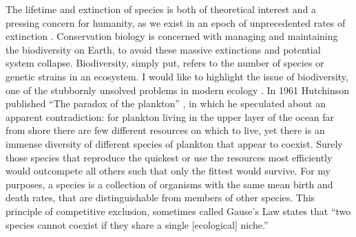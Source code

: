 The lifetime and extinction of species is both of theoretical interest and a pressing concern for humanity, as we exist in an epoch of unprecedented rates of extinction \cite{Saavedra2013}. 
Conservation biology is concerned with managing and maintaining the biodiversity on Earth, to avoid these massive extinctions and potential system collapse. 
Biodiversity, simply put, refers to the number of species or genetic strains in an ecosystem. 
%
I would like to highlight the issue of biodiversity, one of the stubbornly unsolved problems in modern ecology \cite{May1999,Chesson2000,Pennisi2005,Kelly2008}. %
In 1961 Hutchinson published ``The paradox of the plankton'' \cite{Hutchinson1961}, in which he speculated about an apparent contradiction: for plankton living in the upper layer of the ocean far from shore there are few different resources on which to live, yet there is an immense diversity of different species of plankton that appear to coexist. 
Surely those species that reproduce the quickest or use the resources most efficiently would outcompete all others such that only the fittest would survive. 
For my purposes, a species is a collection of organisms with the same mean birth and death rates, that are distinguishable from members of other species. 
This principle of competitive exclusion, sometimes called Gause's Law \cite{Gause1934} states that ``two species cannot coexist if they share a single [ecological] niche.''
